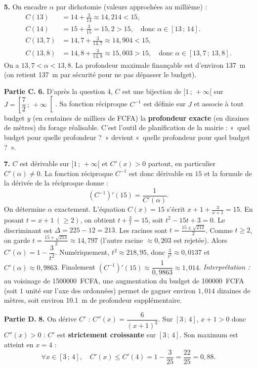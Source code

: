 \documentclass[11pt]{article}
\begin{document}
\begin{exoresolu}
\textbf{5.} On encadre $\alpha$ par dichotomie (valeurs approchées au millième) :
\begin{align*}
C(13) &= 14 + \frac{3}{14} \approx 14{,}214 < 15, \\
C(14) &= 15 + \frac{3}{15} = 15{,}2 > 15, \quad \text{donc } \alpha\in[13\,;\,14]. \\
C(13{,}7) &= 14{,}7 + \frac{3}{14{,}7} \approx 14{,}904 < 15, \\
C(13{,}8) &= 14{,}8 + \frac{3}{14{,}8} \approx 15{,}003 > 15, \quad \text{donc } \alpha\in[13{,}7\,;\,13{,}8].
\end{align*}
On a $13{,}7 < \alpha < 13{,}8$. La profondeur maximale finançable est d'environ \SI{137}{m} (on retient \SI{137}{m} par sécurité pour ne pas dépasser le budget).

\textbf{Partie C.} \textbf{6.} D'après la question 4, $C$ est une bijection de $[1\,;\,+\infty[$ sur $J=\left[\dfrac{7}{2}\,;\,+\infty\right[$. Sa fonction réciproque $C^{-1}$ est définie sur $J$ et associe à tout budget $y$ (en centaines de milliers de FCFA) la \textbf{profondeur exacte} (en dizaines de mètres) du forage réalisable. C'est l'outil de planification de la mairie : «~quel budget pour quelle profondeur ?~» devient «~quelle profondeur pour quel budget ?~».

\textbf{7.} $C$ est dérivable sur $[1\,;\,+\infty[$ et $C'(x)>0$ partout, en particulier $C'(\alpha)\neq 0$. La fonction réciproque $C^{-1}$ est donc dérivable en $15$ et la formule de la dérivée de la réciproque donne :
\[ \left(C^{-1}\right)'(15)=\dfrac{1}{C'(\alpha)}. \]
On détermine $\alpha$ exactement. L'équation $C(x)=15$ s'écrit $x+1+\frac{3}{x+1}=15$. En posant $t=x+1\ (\geq 2)$, on obtient $t+\frac{3}{t}=15$, soit $t^{2}-15t+3=0$.
Le discriminant est $\Delta = 225 - 12 = 213$. Les racines sont $t=\frac{15\pm\sqrt{213}}{2}$. Comme $t\geq 2$, on garde $t=\frac{15+\sqrt{213}}{2}\approx 14{,}797$ (l'autre racine $\approx 0{,}203$ est rejetée).
Alors $C'(\alpha)=1-\dfrac{3}{t^{2}}$. Numériquement, $t^{2}\approx 218{,}95$, donc $\frac{3}{t^{2}}\approx 0{,}0137$ et $C'(\alpha)\approx 0{,}9863$.
Finalement $\left(C^{-1}\right)'(15)\approx \dfrac{1}{0{,}9863}\approx 1{,}014$.
\emph{Interprétation :} au voisinage de \num{1500000}~FCFA, une augmentation du budget de \num{100000}~FCFA (soit $1$ unité sur l'axe des ordonnées) permet de gagner environ $1{,}014$ dizaines de mètres, soit environ \SI{10,1}{m} de profondeur supplémentaire.

\textbf{Partie D.} \textbf{8.} On dérive $C'$ : $C''(x)=\dfrac{6}{(x+1)^{3}}$. Sur $[3\,;\,4]$, $x+1>0$ donc $C''(x)>0$ : $C'$ est \textbf{strictement croissante} sur $[3\,;\,4]$. Son maximum est atteint en $x=4$ :
\[ \forall x\in[3\,;\,4],\quad C'(x)\leq C'(4)=1-\dfrac{3}{25}=\dfrac{22}{25}=0{,}88. \]


\end{exoresolu}
\end{document}
